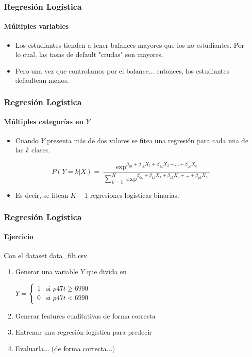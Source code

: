 \documentclass{beamer}
\begin{document}
\begin{frame}
\frametitle{Regresión Logística}
\framesubtitle{Múltiples variables}
\begin{itemize}
	\item Los estudiantes tienden a tener balances mayores que los no estudiantes. Por lo cual, las tasas de default "crudas" son mayores.
	\item Pero una vez que controlamos por el balance... entonces, los estudiantes defaultean menos.
\end{itemize}
\end{frame}

\begin{frame}
\frametitle{Regresión Logística}
\framesubtitle{Múltiples categorías en $Y$}
\begin{itemize}
	\item Cuando $Y$ presenta más de dos valores se fitea una regresión para cada una de las $k$ clases. 
	
	\begin{equation}
	P(Y=k | X) = \frac{\exp^{\beta_{0k} + \beta_{1k}X_{1} + \beta_{2k}X_{2} + ... + \beta_{pk}X_{p}}}{\sum_{k=1}^K \exp^{\beta_{0k} + \beta_{1k}X_{1} + \beta_{2k}X_{2} + ... + \beta_{pk}X_{p}}}   
	\end{equation}
	
	\item Es decir, se fitean $K-1$ regresiones logísticas binarias.
\end{itemize}
\end{frame}

\begin{frame}
\frametitle{Regresión Logística}
\framesubtitle{Ejercicio}
Con el dataset data\_filt.csv
\begin{enumerate}
	\item Generar una variable $Y$ que divida en 
	
	$ Y = \begin{cases} 
			1 & \text{si } p47t \geq 6990 \\
			0 & \text{si } p47t < 6990 
		\end{cases} 
	$
	\item Generar features cualitativas de forma correcta
	\item Entrenar una regresión logística para predecir 
	\item Evaluarla... (de forma correcta...)
\end{enumerate}
\end{frame}
\end{document}
